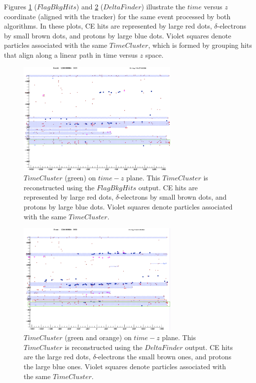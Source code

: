 Figures \ref{fig:TZCluster1} ($FlagBkgHits$) and 
\ref{fig:TZCluster2} ($DeltaFinder$) illustrate the 
$time$ versus $z$ coordinate (aligned with the tracker) for 
the same event processed by both algorithms. In these plots, 
CE hits are represented by large red dots, $\delta$-electrons 
by small brown dots, and protons by large blue dots. Violet 
squares denote particles associated with the same $TimeCluster$, 
which is formed by grouping hits that align along a linear 
path in time versus $z$ space.
\begin{figure}[!h]
    \centering
    \includegraphics[width =0.7\textwidth]{figures/png/Screenshot_20240819_153229.png}
    \caption[$TimeCluster$ on $time-z$ plane.]{$TimeCluster$ (green) on $time-z$ plane. 
    This $TimeCluster$ is reconstructed using the $FlagBkgHits$ output.
    CE hits are represented by large red dots, $\delta$-electrons 
    by small brown dots, and protons by large blue dots. Violet 
    squares denote particles associated with the same $TimeCluster$.}
    \label{fig:TZCluster1}
\end{figure}
\begin{figure}[!h]
    \centering
    \includegraphics[width =0.7\textwidth]{figures/png/Screenshot_20240819_153730.png}
    \caption[$TimeCluster$ on $time-z$ plane.]{$TimeCluster$ (green and orange) on $time-z$ 
    plane. This $TimeCluster$ is reconstructed using the $DeltaFinder$ output.
    CE hits are the large red dots, $\delta$-electrons 
    the small brown ones, and protons the large blue ones. Violet 
    squares denote particles associated with the same $TimeCluster$.}
    \label{fig:TZCluster2}
\end{figure}
